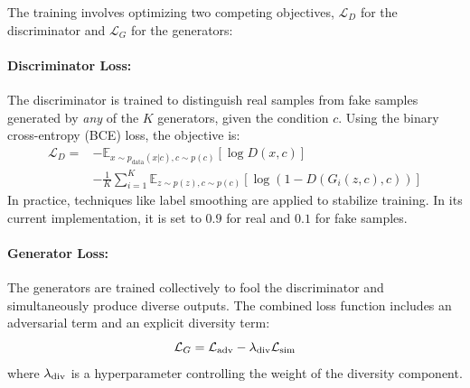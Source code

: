 The training involves optimizing two competing objectives, \( \mathcal{L}_D \) for the discriminator and \( \mathcal{L}_G \) for the generators:

\paragraph{Discriminator Loss:}
The discriminator is trained to distinguish real samples from fake samples generated by \textit{any} of the \( K \) generators, given the condition \( c \). Using the binary cross-entropy (BCE) loss, the objective is:
\begin{equation}
\label{eq:cmadgan_loss_d}
\begin{split}
\mathcal{L}_D = & - \mathbb{E}_{x \sim p_{\text{data}}(x|c), c \sim p(c)} [\log D(x, c)] \\
& - \frac{1}{K} \sum_{i=1}^{K} \mathbb{E}_{z \sim p(z), c \sim p(c)} [\log(1 - D(G_i(z, c), c))]
\end{split}
\end{equation}
In practice, techniques like label smoothing are applied to stabilize training. In its current implementation, it is set to \(0.9\) for real and \(0.1\) for fake samples.

\paragraph{Generator Loss:}
The generators are trained collectively to fool the discriminator and simultaneously produce diverse outputs. The combined loss function includes an adversarial term and an explicit diversity term:
\begin{equation}
\label{eq:cmadgan_loss_g}
\mathcal{L}_G = \mathcal{L}_{\text{adv}} - \lambda_{\text{div}} \mathcal{L}_{\text{sim}}
\end{equation}
where \( \lambda_{\text{div}} \) is a hyperparameter controlling the weight of the diversity component.

